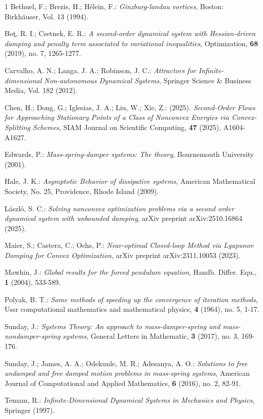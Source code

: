\documentclass[12pt]{amsart}
\numberwithin{equation}{section}
\begin{document}
\begin{thebibliography}{1}
 Bethuel, F.; Brezis, H.; Hélein, F.: {\it Ginzburg-landau vortices}, Boston: Birkhäuser, Vol. 13 (1994).

 Bo\c{t}, R. I.; Csetnek, E. R.: {\it A second-order dynamical system with Hessian-driven damping and penalty term associated to variational inequalities}, Optimization, {\bf 68} (2019), no. 7, 1265-1277. 

 Carvalho, A. N.;  Langa, J. A.; Robinson, J. C.: {\it Attractors for Infinite-dimensional Non-autonomous Dynamical Systems},  Springer Science \& Business Media, Vol. 182 (2012).

 Chen, H.; Dong, G.; Iglesias, J. A.; Liu, W.; Xie, Z.: (2025). {\it Second-Order Flows for Approaching Stationary Points of a Class of Nonconvex Energies via Convex-Splitting Schemes}, SIAM Journal on Scientific Computing, {\bf 47} (2025), A1604-A1627.  

 Edwards, P.: {\it Mass-spring-damper systems: The theory}, Bournemouth University (2001).

 Hale, J. K.: {\it Asymptotic Behavior of dissipative systems}, American Mathematical Society, No. 25, Providence, Rhode Island (2009). 

 László, S. C.: {\it Solving nonconvex optimization problems via a second order dynamical system with unbounded damping}, arXiv preprint arXiv:2510.16864 (2025).

 Maier, S.; Castera, C.; Ochs, P.: {\it Near-optimal Closed-loop Method via Lyapunov Damping for Convex Optimization}, arXiv preprint arXiv:2311.10053 (2023).

 Mawhin, J.: {\it Global results for the forced pendulum equation}, Handb. Differ. Equ., {\bf 1} (2004), 533-589.

 Polyak, B. T.: {\it Some methods of speeding up the convergence of iteration methods}, Ussr computational mathematics and mathematical physics, {\bf 4} (1964), no. 5, 1-17.

 Sunday, J.: {\it Systems Theory: An approach to mass-damper-spring and mass-nondamper-spring systems}, General Letters in Mathematic, {\bf 3} (2017), no. 3, 169-176.

 Sunday, J.; James, A. A.; Odekunle, M. R.; Adesanya, A. O.: {\it Solutions to free undamped and free damped motion problems in mass-spring systems}, American Journal of Computational and Applied Mathematics, {\bf 6} (2016), no. 2, 82-91.

 Temam, R.: {\it Infinite-Dimensional Dynamical Systems in Mechanics and Physics}, Springer (1997).

\end{thebibliography}
\end{document}
